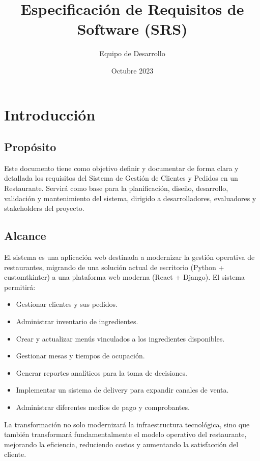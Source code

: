 \documentclass[12pt]{article}
\title{Especificación de Requisitos de Software (SRS)}
\author{Equipo de Desarrollo}
\date{Octubre 2023}
\begin{document}
\maketitle

\tableofcontents

\newpage

\section{Introducción}
\subsection{Propósito}
Este documento tiene como objetivo definir y documentar de forma clara y detallada los requisitos del Sistema de Gestión de Clientes y Pedidos en un Restaurante. Servirá como base para la planificación, diseño, desarrollo, validación y mantenimiento del sistema, dirigido a desarrolladores, evaluadores y stakeholders del proyecto.

\subsection{Alcance}
El sistema es una aplicación web destinada a modernizar la gestión operativa de restaurantes, migrando de una solución actual de escritorio (Python + customtkinter) a una plataforma web moderna (React + Django). El sistema permitirá:
\begin{itemize}
  \item Gestionar clientes y sus pedidos.
  \item Administrar inventario de ingredientes.
  \item Crear y actualizar menús vinculados a los ingredientes disponibles.
  \item Gestionar mesas y tiempos de ocupación.
  \item Generar reportes analíticos para la toma de decisiones.
  \item Implementar un sistema de delivery para expandir canales de venta.
  \item Administrar diferentes medios de pago y comprobantes.
\end{itemize}

La transformación no solo modernizará la infraestructura tecnológica, sino que también transformará fundamentalmente el modelo operativo del restaurante, mejorando la eficiencia, reduciendo costos y aumentando la satisfacción del cliente.
\end{document}
